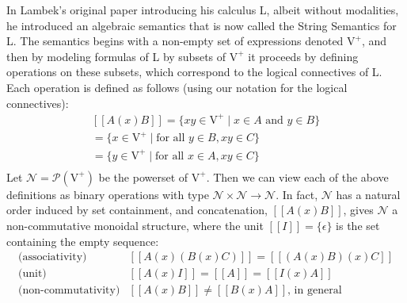 \documentclass{article}
\let\mto\to                     %
\let\to\relax                   %
\newcommand{\to}{\rightarrow}
\newcommand{\V}{\text{V}^+}
\newcommand{\N}{\mathcal{N}}
\newcommand{\pow}[1]{\mathcal{P}(#1)}
\begin{document}
In Lambek's original paper \cite{Lambek1958} introducing his calculus
L, albeit without modalities, he introduced an algebraic semantics
that is now called the String Semantics for L.  The semantics begins
with a non-empty set of expressions denoted $\V$, and then by modeling
formulas of L by subsets of $\V$ it proceeds by defining operations on
these subsets, which correspond to the logical connectives of L.  Each
operation is defined as follows (using our notation for the logical
connectives):
\[
\begin{array}{c}
  [[A (x) B]] = \{xy \in \V \mid x \in A \text{ and } y \in B\}\\
  [[C <- B]] = \{x \in \V \mid \text{for all } y \in B, xy \in C\}\\
  [[A -> C]] = \{y \in \V \mid \text{for all } x \in A, xy \in C\}\\
\end{array}
\]
Let $\N = \pow{\V}$ be the powerset of $\V$.  Then we can view each of
the above definitions as binary operations with type $\N \times \N \mto
\N$. In fact, $\N$ has a natural order induced by set containment, and
concatenation, $[[A (x) B]]$, gives $\N$ a non-commutative monoidal
structure, where the unit $[[I]] = \{\epsilon\}$ is the set containing
the empty sequence:
\[
\begin{array}{lll}
  \text{(associativity)} & [[A (x) (B (x) C)]] = [[(A (x) B) (x) C]]\\
  \text{(unit)} & [[A (x) I]] = [[A]] = [[I (x) A]]\\
  \text{(non-commutativity)} & [[A (x) B]] \neq [[B (x) A]]\text{, in general}
\end{array}
\]
\end{document}
